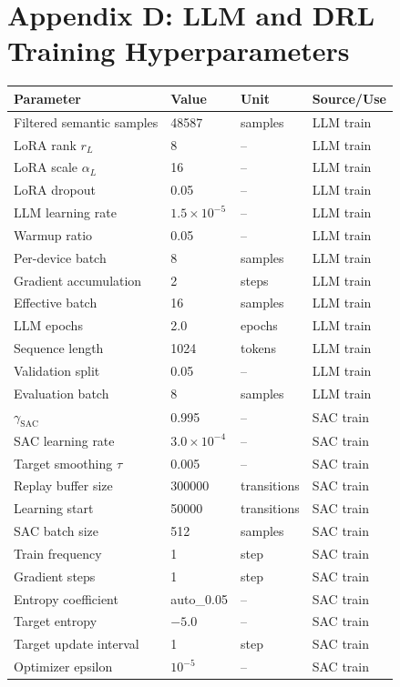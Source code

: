 \documentclass[11pt]{article}
\begin{document}
\clearpage
\section*{Appendix D: LLM and DRL Training Hyperparameters}

\begin{center}
\footnotesize
\begin{tabularx}{\textwidth}{@{}Z M M Z@{}}
\toprule
Parameter & Value & Unit & Source/Use \\
\midrule
Filtered semantic samples & 48587 & samples & LLM train \\
LoRA rank $r_L$ & 8 & -- & LLM train \\
LoRA scale $\alpha_L$ & 16 & -- & LLM train \\
LoRA dropout & 0.05 & -- & LLM train \\
LLM learning rate & $1.5\times10^{-5}$ & -- & LLM train \\
Warmup ratio & 0.05 & -- & LLM train \\
Per-device batch & 8 & samples & LLM train \\
Gradient accumulation & 2 & steps & LLM train \\
Effective batch & 16 & samples & LLM train \\
LLM epochs & 2.0 & epochs & LLM train \\
Sequence length & 1024 & tokens & LLM train \\
Validation split & 0.05 & -- & LLM train \\
Evaluation batch & 8 & samples & LLM train \\
$\gamma_{\mathrm{SAC}}$ & 0.995 & -- & SAC train \\
SAC learning rate & $3.0\times10^{-4}$ & -- & SAC train \\
Target smoothing $\tau$ & 0.005 & -- & SAC train \\
Replay buffer size & 300000 & transitions & SAC train \\
Learning start & 50000 & transitions & SAC train \\
SAC batch size & 512 & samples & SAC train \\
Train frequency & 1 & step & SAC train \\
Gradient steps & 1 & step & SAC train \\
Entropy coefficient & auto\_0.05 & -- & SAC train \\
Target entropy & $-5.0$ & -- & SAC train \\
Target update interval & 1 & step & SAC train \\
Optimizer epsilon & $10^{-5}$ & -- & SAC train \\
\bottomrule
\end{tabularx}
\end{center}
\end{document}
